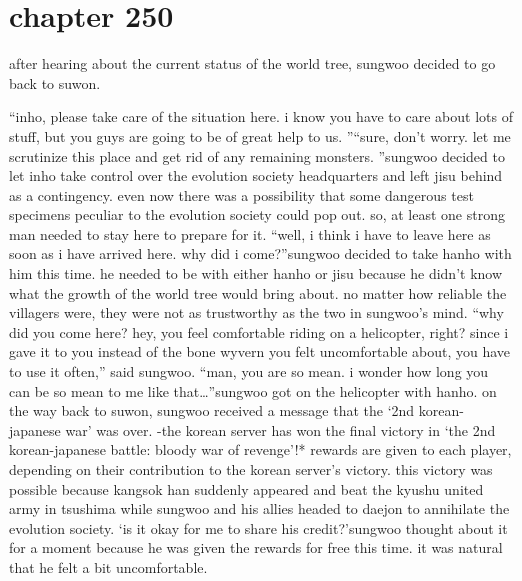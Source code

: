 \section{chapter 250}

                            after hearing about the current status of the world tree, sungwoo decided to go back to suwon.





“inho, please take care of the situation here.
 i know you have to care about lots of stuff, but you guys are going to be of great help to us.
”“sure, don’t worry.
 let me scrutinize this place and get rid of any remaining monsters.
”sungwoo decided to let inho take control over the evolution society headquarters and left jisu behind as a contingency.
even now there was a possibility that some dangerous test specimens peculiar to the evolution society could pop out.
 so, at least one strong man needed to stay here to prepare for it.
“well, i think i have to leave here as soon as i have arrived here.
 why did i come?”sungwoo decided to take hanho with him this time.
 he needed to be with either hanho or jisu because he didn’t know what the growth of the world tree would bring about.
no matter how reliable the villagers were, they were not as trustworthy as the two in sungwoo’s mind.
“why did you come here? hey, you feel comfortable riding on a helicopter, right? since i gave it to you instead of the bone wyvern you felt uncomfortable about, you have to use it often,” said sungwoo.
“man, you are so mean.
 i wonder how long you can be so mean to me like that…”sungwoo got on the helicopter with hanho.
on the way back to suwon, sungwoo received a message that the ‘2nd korean-japanese war’ was over.
-the korean server has won the final victory in ‘the 2nd korean-japanese battle: bloody war of revenge’!* rewards are given to each player, depending on their contribution to the korean server’s victory.
this victory was possible because kangsok han suddenly appeared and beat the kyushu united army in tsushima while sungwoo and his allies headed to daejon to annihilate the evolution society.
‘is it okay for me to share his credit?’sungwoo thought about it for a moment because he was given the rewards for free this time.
 it was natural that he felt a bit uncomfortable.

